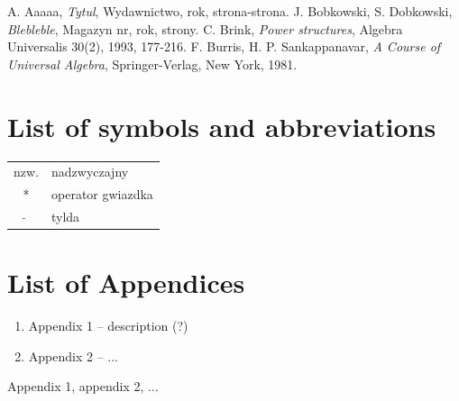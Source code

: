 \documentclass[a4paper,11pt,twoside]{report}
\theoremstyle{definition}
\begin{document}

\begin{thebibliography}{20}

 A. Aaaaa, \emph{Tytul}, Wydawnictwo, rok, strona-strona.
 J. Bobkowski, S. Dobkowski, \emph{Blebleble}, Magazyn nr, rok, strony.
 C. Brink, \emph{Power structures}, Algebra Universalis 30(2), 1993, 177-216.
 F. Burris, H. P. Sankappanavar, \emph{A Course of Universal Algebra}, Springer-Verlag, New York, 1981.
\end{thebibliography}
\thispagestyle{empty}


\chapter*{List of symbols and abbreviations}

\begin{tabular}{cl}
nzw. & nadzwyczajny \\
* & operator gwiazdka \\
$\widetilde{}$ & tylda
\end{tabular}
\thispagestyle{empty}


\listoffigures
\thispagestyle{empty}



\listoftables
\thispagestyle{empty}




\chapter*{List of Appendices}
\begin{enumerate}[itemsep = 0pt]
\item Appendix 1 -- description (?)
\item Appendix 2 -- ...
\end{enumerate}
\thispagestyle{empty}


\newpage
\pagestyle{empty} 
Appendix 1, appendix 2, ...
\end{document}
